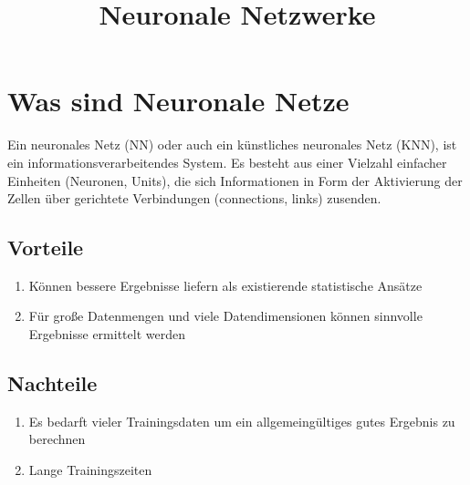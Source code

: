 \documentclass[a4paper,12pt]{article}
\begin{document}
\title{Neuronale Netzwerke}
\section{Was sind Neuronale Netze}
Ein neuronales Netz (NN) oder auch ein künstliches neuronales Netz (KNN), ist ein informationsverarbeitendes System. Es besteht aus einer Vielzahl einfacher Einheiten (Neuronen, Units), die sich Informationen in Form der Aktivierung der Zellen über gerichtete Verbindungen (connections, links) zusenden.
\subsection{Vorteile}
\begin{center}
\begin{enumerate}
\item Können bessere Ergebnisse liefern als existierende statistische Ansätze
\item Für große Datenmengen und viele Datendimensionen können sinnvolle Ergebnisse ermittelt werden
\end{enumerate}
\end{center}
\subsection{Nachteile}
\begin{center}
\begin{enumerate}
\item Es bedarft vieler Trainingsdaten um ein allgemeingültiges gutes Ergebnis zu berechnen
\item Lange Trainingszeiten
\end{enumerate}
\end{center}
\end{document}
